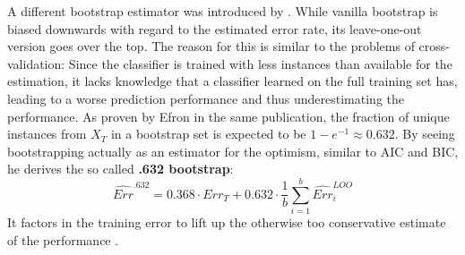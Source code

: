 A different bootstrap estimator was introduced by \cite{Efron1983}. While vanilla bootstrap is biased downwards with regard to the estimated error rate, its leave-one-out version goes over the top. The reason for this is similar to the problems of cross-validation: Since the classifier is trained with less instances than available for the estimation, it lacks knowledge that a classifier learned on the full training set has, leading to a worse prediction performance and thus underestimating the performance. As proven by Efron in the same publication, the fraction of unique instances from $X_T$ in a bootstrap set is expected to be $1 - e^{-1} \approx 0.632$. By seeing bootstrapping actually as an estimator for the optimism, similar to AIC and BIC, he derives the so called \textbf{.632 bootstrap}:
\begin{equation}
\widehat{Err}^{.632} = 0.368 \cdot Err_T + 0.632 \cdot \frac{1}{b} \sum_{i=1}^{b} \widehat{Err}^{LOO}_i
\end{equation}
It factors in the training error to lift up the otherwise too conservative estimate of the performance \cite{Efron1983}.

